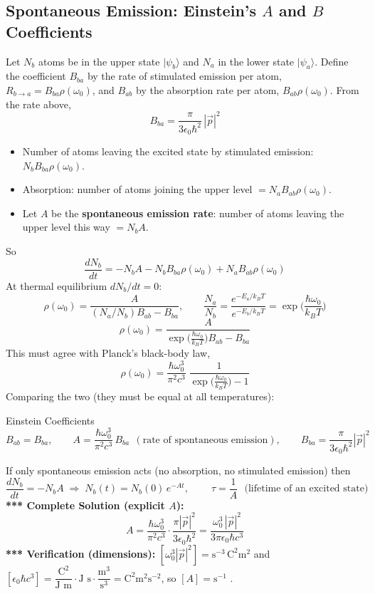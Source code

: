 \documentclass[11pt,a4paper]{article}
\begin{document}
\subsection{Spontaneous Emission: Einstein's \texorpdfstring{$A$}{A} and \texorpdfstring{$B$}{B} Coefficients}
Let $N_b$ atoms be in the upper state $|\psi_b\rangle$ and $N_a$ in the lower state $|\psi_a\rangle$. Define the coefficient $B_{ba}$ by the rate of stimulated emission per atom, $R_{b\to a}=B_{ba}\rho(\omega_0)$, and $B_{ab}$ by the absorption rate per atom, $B_{ab}\rho(\omega_0)$. From the rate above,
\[
B_{ba}=\frac{\pi}{3\epsilon_0\hbar^2}\,|\vec p|^2
\]
\begin{itemize}
    \item Number of atoms leaving the excited state by stimulated emission: $N_bB_{ba}\rho(\omega_0)$.
    \item Absorption: number of atoms joining the upper level $=N_aB_{ab}\rho(\omega_0)$.
    \item Let $A$ be the \textbf{spontaneous emission rate}: number of atoms leaving the upper level this way $=N_bA$.
\end{itemize}
So
\[
\frac{dN_b}{dt}=-N_bA-N_bB_{ba}\rho(\omega_0)+N_aB_{ab}\rho(\omega_0)
\]
At thermal equilibrium $dN_b/dt=0$:
\[
\rho(\omega_0)=\frac A{(N_a/N_b)B_{ab}-B_{ba}},\qquad
\frac{N_a}{N_b}=\frac{e^{-E_a/k_BT}}{e^{-E_b/k_BT}}=\exp\Big(\frac{\hbar\omega_0}{k_BT}\Big)
\]
\[
\rho(\omega_0)=\frac A{\exp\big(\frac{\hbar\omega_0}{k_BT}\big)B_{ab}-B_{ba}}
\]
This must agree with Planck's black-body law,
\[
\rho(\omega_0)=\frac{\hbar\omega_0^3}{\pi^2c^3}\;\frac1{\exp\big(\frac{\hbar\omega_0}{k_BT}\big)-1}
\]
Comparing the two (they must be equal at all temperatures):
\begin{thm}{Einstein Coefficients}
\[
B_{ab}=B_{ba},\qquad A=\frac{\hbar\omega_0^3}{\pi^2c^3}\,B_{ba}\ \ (\text{rate of spontaneous emission}),\qquad B_{ba}=\frac\pi{3\epsilon_0\hbar^2}|\vec p|^2
\]
\end{thm}
If only spontaneous emission acts (no absorption, no stimulated emission) then
\[
\frac{dN_b}{dt}=-N_bA\;\Longrightarrow\;N_b(t)=N_b(0)\,e^{-At},\qquad\boxed{\ \tau=\frac1A\ }\ \ \text{(lifetime of an excited state)}
\]
\textbf{*** Complete Solution (explicit $A$):}
\[
A=\frac{\hbar\omega_0^3}{\pi^2c^3}\cdot\frac{\pi|\vec p|^2}{3\epsilon_0\hbar^2}=\frac{\omega_0^3\,|\vec p|^2}{3\pi\epsilon_0\hbar c^3}
\]
\textbf{*** Verification (dimensions):} $[\omega_0^3|\vec p|^2]=\text{s}^{-3}\,\text{C}^2\text{m}^2$ and $[\epsilon_0\hbar c^3]=\dfrac{\text{C}^2}{\text{J m}}\cdot\text{J s}\cdot\dfrac{\text{m}^3}{\text{s}^3}=\text{C}^2\text{m}^2\text{s}^{-2}$, so $[A]=\text{s}^{-1}$ \checkmark.
\end{document}
